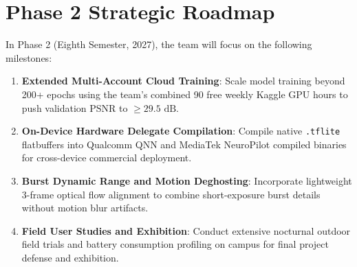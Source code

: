 \section{Phase 2 Strategic Roadmap}
In Phase 2 (Eighth Semester, 2027), the team will focus on the following milestones:
\begin{enumerate}
    \item \textbf{Extended Multi-Account Cloud Training}: Scale model training beyond 200+ epochs using the team's combined 90 free weekly Kaggle GPU hours to push validation PSNR to $\ge 29.5\text{ dB}$.
    \item \textbf{On-Device Hardware Delegate Compilation}: Compile native \texttt{.tflite} flatbuffers into Qualcomm QNN and MediaTek NeuroPilot compiled binaries for cross-device commercial deployment.
    \item \textbf{Burst Dynamic Range and Motion Deghosting}: Incorporate lightweight 3-frame optical flow alignment to combine short-exposure burst details without motion blur artifacts.
    \item \textbf{Field User Studies and Exhibition}: Conduct extensive nocturnal outdoor field trials and battery consumption profiling on campus for final project defense and exhibition.
\end{enumerate}
